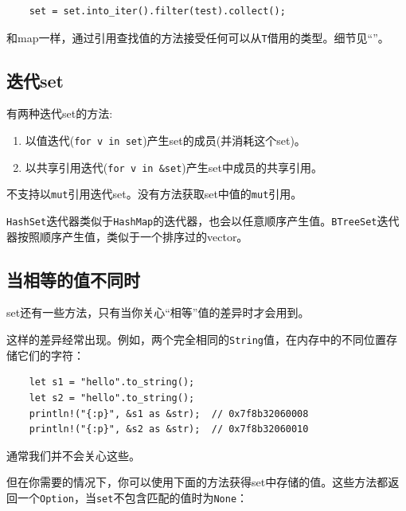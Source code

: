 
\begin{verbatim}
    set = set.into_iter().filter(test).collect();
\end{verbatim}

和map一样，通过引用查找值的方法接受任何可以从\texttt{T}借用的类型。细节见“”。

\subsection{迭代set}
有两种迭代set的方法:
\begin{enumerate}
    \item 以值迭代(\texttt{for v in set})产生set的成员(并消耗这个set)。
    \item 以共享引用迭代(\texttt{for v in \&set})产生set中成员的共享引用。
\end{enumerate}

不支持以\texttt{mut}引用迭代set。没有方法获取set中值的\texttt{mut}引用。


\texttt{HashSet}迭代器类似于\texttt{HashMap}的迭代器，也会以任意顺序产生值。\texttt{BTreeSet}迭代器按照顺序产生值，类似于一个排序过的vector。

\subsection{当相等的值不同时}
set还有一些方法，只有当你关心“相等”值的差异时才会用到。

这样的差异经常出现。例如，两个完全相同的\texttt{String}值，在内存中的不同位置存储它们的字符：

\begin{verbatim}
    let s1 = "hello".to_string();
    let s2 = "hello".to_string();
    println!("{:p}", &s1 as &str);  // 0x7f8b32060008
    println!("{:p}", &s2 as &str);  // 0x7f8b32060010
\end{verbatim}

通常我们并不会关心这些。

但在你需要的情况下，你可以使用下面的方法获得set中存储的值。这些方法都返回一个\texttt{Option}，当\texttt{set}不包含匹配的值时为\texttt{None}：


